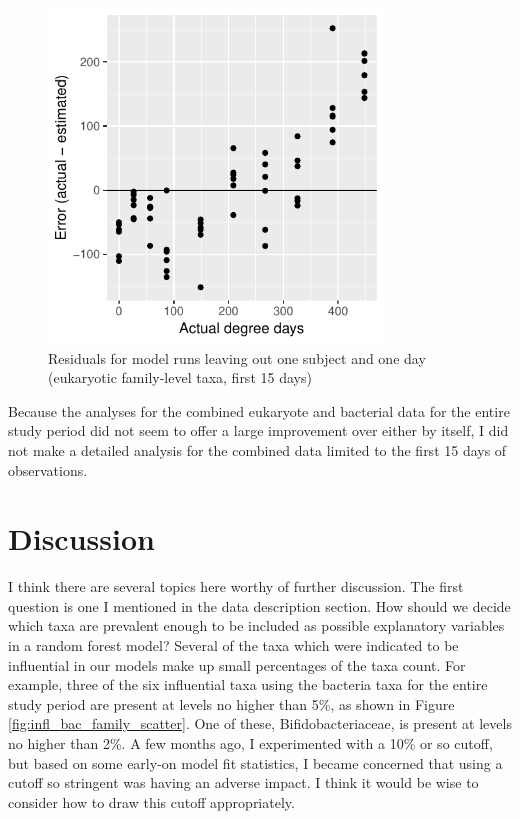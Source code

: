 \documentclass{article}
\begin{document}
\begin{figure}
  \centering
  \includegraphics[width=3.5in]{../eukaryote_data/only_families/first_two_weeks/hit_1perc_twice/leave_out_one_subj_and_one_day_residuals}
  \caption{Residuals for model runs leaving out one subject and one day (eukaryotic family-level taxa, first 15 days)}
  \label{fig:leave_one_out_resids_euk_family_taxa_first_15}
\end{figure}

Because the analyses for the combined eukaryote and bacterial data for
the entire study period did not seem to offer a large improvement over
either by itself, I did not make a detailed analysis for the combined
data limited to the first 15 days of observations.


\section{Discussion}

I think there are several topics here worthy of further discussion.
The first question is one I mentioned in the data description section.
How should we decide which taxa are prevalent enough to be included as
possible explanatory variables in a random forest model?  Several of
the taxa which were indicated to be influential in our models make up
small percentages of the taxa count.  For example, three of the six
influential taxa using the bacteria taxa for the entire study period
are present at levels no higher than 5\%, as shown in Figure
\ref{fig:infl_bac_family_scatter}.  One of these, Bifidobacteriaceae,
is present at levels no higher than 2\%.  A few months ago, I
experimented with a 10\% or so cutoff, but based on some early-on
model fit statistics, I became concerned that using a cutoff so
stringent was having an adverse impact.  I think it would be wise to
consider how to draw this cutoff appropriately.
\end{document}
